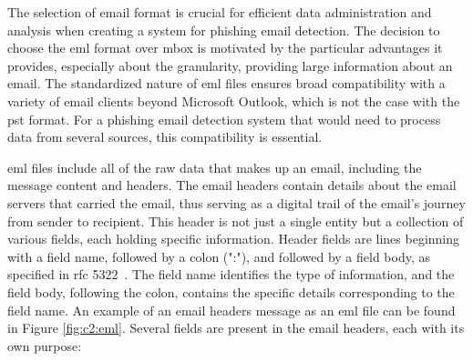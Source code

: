 The selection of email format is crucial for efficient data administration and analysis when creating a system for phishing email detection. The decision to choose the \ac{eml} format over \ac{mbox} is motivated by the particular advantages it provides, especially about the granularity, providing large information about an email. The standardized nature of \ac{eml} files ensures broad compatibility with a variety of email clients beyond Microsoft Outlook, which is not the case with the \ac{pst} format. For a phishing email detection system that would need to process data from several sources, this compatibility is essential.

\ac{eml} files include all of the raw data that makes up an email, including the message content and headers. The email headers contain details about the email servers that carried the email, thus serving as a digital trail of the email's journey from sender to recipient. This header is not just a single entity but a collection of various fields, each holding specific information.  Header fields are lines beginning with a field name, followed by a colon (":"), and followed by a field body, as specified in \ac{rfc} 5322~\cite{rfc5322}. The field name identifies the type of information, and the field body, following the colon, contains the specific details corresponding to the field name.
An example of an email headers message as an \ac{eml} file can be found in Figure \ref{fig:c2:eml}. Several fields are present in the email headers, each with its own purpose:


